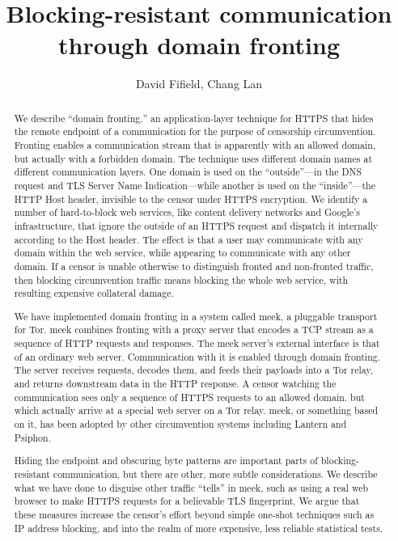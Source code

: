 \documentclass[conference]{IEEEtran}
\begin{document}
\title{Blocking-resistant communication\\through domain fronting}

\author{David Fifield, Chang Lan}
\author{
}

\maketitle

\begin{abstract}
We describe ``domain fronting,'' an application-layer technique
for HTTPS
that hides the remote endpoint of a communication
for the purpose of censorship circumvention.
Fronting enables a communication stream that is apparently with an allowed domain,
but actually with a forbidden domain.
The technique uses different domain names at different communication layers.
One domain is used on the ``outside''---in the DNS request and
TLS Server Name Indication---while another is used
on the ``inside''---the HTTP Host header, invisible to the
censor under HTTPS encryption.
We identify a number of hard-to-block web services,
like content delivery networks and Google's infrastructure,
that ignore the outside of an HTTPS request
and dispatch it internally according to the Host header.
The effect is that a user may communicate with any domain within the web service,
while appearing to communicate with any other domain.
If a censor is unable otherwise to distinguish fronted and non-fronted traffic,
then blocking circumvention traffic means blocking the whole web service,
with resulting expensive collateral damage.

We have implemented domain fronting in a system called meek,
a pluggable transport for Tor.
meek combines fronting with a proxy server that encodes a TCP stream
as a sequence of HTTP requests and responses.
The meek server's external interface is that of an ordinary web server.
Communication with it is enabled through domain fronting.
The server receives requests, decodes them, and feeds their payloads into a Tor relay,
and returns downstream data in the HTTP response.
A censor watching the communication sees only a sequence of HTTPS requests to an allowed domain.
but which actually arrive at a special web server on a Tor relay.
meek, or something based on it,
has been adopted by other circumvention systems including Lantern and Psiphon.

Hiding the endpoint and obscuring byte patterns are important parts of blocking-resistant communication,
but there are other, more subtle considerations.
We describe what we have done to disguise other traffic ``tells'' in meek,
such as using a real web browser to make HTTPS requests
for a believable TLS fingerprint.
We argue that these measures increase the censor's effort
beyond simple one-shot techniques such as IP address blocking, and into
the realm of more expensive, less reliable statistical tests.
\end{abstract}
\end{document}
